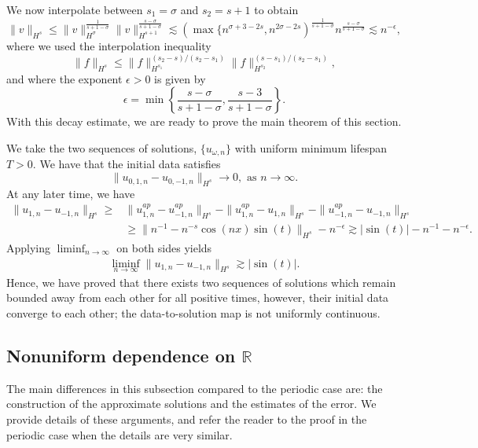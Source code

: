 \documentclass[reqno]{amsart}
\theoremstyle{plain}
\numberwithin{equation}{section}
\begin{document}
We now interpolate between $s_1 = \sigma$ and $s_2 = s+1$ to obtain 
$$
\| v\| _{H^s}
\le \|v\| _{H^\sigma} ^{\frac1{s+1-\sigma}}\|v\| _{H^{s+1}} ^{\frac{s-\sigma}{s+1-\sigma}}
\lesssim 
\left( \max\{ n^{\sigma+3-2s} , n^{2\sigma-2s} \right) ^{\frac1{s+1-\sigma}} n^{\frac{s-\sigma}{s+1-\sigma}} \lesssim n^{-\epsilon},
$$
where we used the interpolation inequality
 $$
 \|f\|_{H^s} \le \|f\|_{H^{s_1}} ^{(s_2-s)/(s_2-s_1) }  \|f\|_{H^{s_2}}^{(s-s_1)/(s_2-s_1) } ,
 $$
 and
where the exponent $\epsilon > 0$ is given by
$$
\epsilon = \min\left\{ \frac{s - \sigma}{s+1-\sigma} , \frac{s-3}{s+1-\sigma}\right\}.
$$
With this decay estimate, we are ready to prove the main theorem of this section. 



We take the two sequences of solutions, $\{ u_{\omega, n}\}$ with uniform minimum lifespan $T>0$. We have that the initial data satisfies 
$$
\| u_{0,1, n}- u_{0,-1, n}\|_{H^s} \rightarrow 0, \text{ as }  n\rightarrow \infty. 
$$
At any later time, we have 
\begin{align}
\| u_{1,n} - u_{-1,n} \| _{H^s} 
 \ge &  \| u_{1,n}^{ap} - u_{-1,n}^{ap}  \| _{H^s} - \| u_{1,n}^{ap} - u_{1,n}  \| _{H^s} -  \| u_{-1,n}^{ap} - u_{-1,n}  \| _{H^s}
\\
& \ge \|  n^{-1} - n^{-s} \cos(nx)\sin(t)  \| _{H^s}  - n^{-\epsilon} \gtrsim |\sin(t)| - n^{-1} -n^{-\epsilon} . 
\end{align}
Applying $\liminf_{n\rightarrow \infty}$ on both sides yields 
\begin{align}
\liminf_{n\rightarrow\infty} \| u_{1,n} - u_{-1,n} \| _{H^s}  \gtrsim |\sin(t)| .
\end{align}
Hence, we have proved that there exists two sequences of solutions which remain bounded away from each other for all positive times, however, their initial data converge to each other; the data-to-solution map is not uniformly continuous. 
 
 

\subsection{Nonuniform dependence on $\mathbb R$} The main differences in this subsection compared to the periodic case are: the construction of the approximate solutions and the estimates of the error. We provide details of these arguments, and refer the reader to the proof in the periodic case when the details are very similar. 
\end{document}
